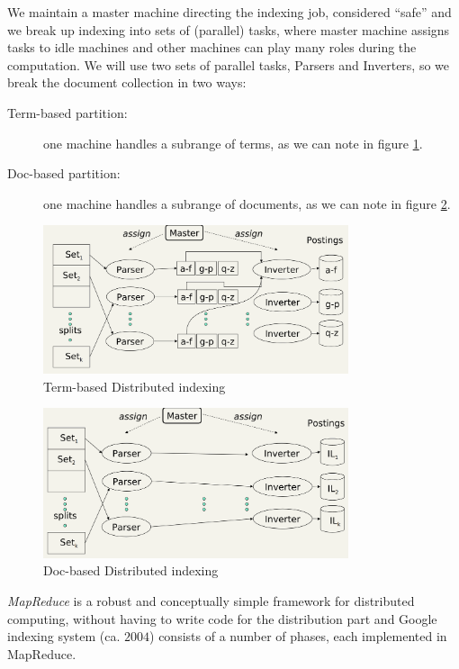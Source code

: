 We maintain a master machine directing the indexing job, considered “safe” and we break up indexing 
into sets of (parallel) tasks, where master machine assigns tasks to idle machines and other machines
can play many roles during the computation.\newline
We will use two sets of parallel tasks, Parsers and Inverters, so we break the document collection in two ways:
\begin{description}
	\item [Term-based partition: ] one machine handles a subrange of terms,
		                       as we can note in figure \ref{img:termBased}.
    \item [Doc-based partition: ] one machine handles a subrange of documents, 
	    			  as we can note in figure \ref{img:docBased}.
\end{description}

\begin{figure}
	\includegraphics[width=0.8\textwidth]{Images/termBased}
	\caption{Term-based Distributed indexing}
	\label{img:termBased}
\end{figure}
\begin{figure}
	\includegraphics[width=0.8\textwidth]{Images/docBased}
	\caption{Doc-based Distributed indexing}
	\label{img:docBased}
\end{figure}
\emph{MapReduce} is a robust and conceptually simple framework for distributed computing, 
without having to write code for the distribution part and Google indexing system (ca. $2004$) 
consists of a number of phases, each implemented in MapReduce.


